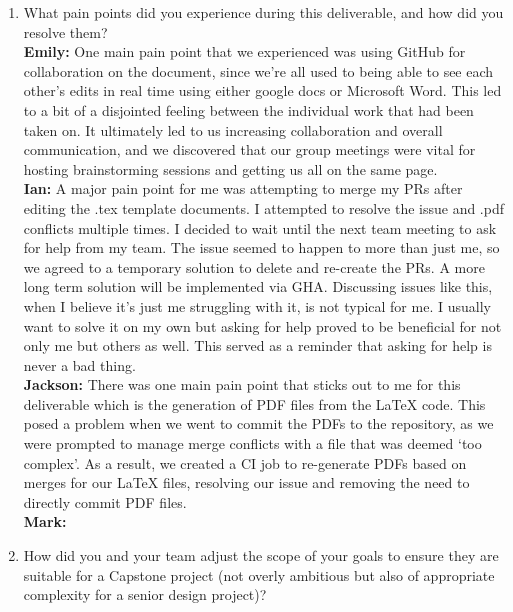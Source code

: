 \documentclass{article}
\begin{document}
\begin{enumerate}
    \item What pain points did you experience during this deliverable, and how
    did you resolve them?\\
    \textbf{Emily:} One main pain point that we experienced was using GitHub for collaboration on the document, since we’re all used to being able to see each 
                    other’s edits in real time using either google docs or Microsoft Word. This led to a bit of a disjointed feeling between the individual work 
                    that had been taken on. It ultimately led to us increasing collaboration and overall communication, and we discovered that our group meetings 
                    were vital for hosting brainstorming sessions and getting us all on the same page. \\
    \textbf{Ian:} A major pain point for me was attempting to merge my PRs after editing the .tex template documents. I attempted to resolve the issue and .pdf conflicts multiple times. 
    I decided to wait until the next team meeting to ask for help from my team. The issue seemed to happen to more than just me, so we agreed to a temporary solution to delete and re-create 
    the PRs. A more long term solution will be implemented via GHA. Discussing issues like this, when I believe it’s just me struggling with it, is not typical for me. I usually want to solve 
    it on my own but asking for help proved to be beneficial for not only me but others as well. This served as a reminder that asking for help is never a bad thing.\\
    \textbf{Jackson:} There was one main pain point that sticks out to me for this deliverable which is the generation of PDF files from the LaTeX code. This posed 
                    a problem when we went to commit the PDFs to the repository, as we were prompted to manage merge conflicts with a file that was deemed ‘too complex’. As a result, 
                    we created a CI job to re-generate PDFs based on merges for our LaTeX files, resolving our issue and removing the need to directly commit PDF files.\\
    \textbf{Mark:} \\

    \item How did you and your team adjust the scope of your goals to ensure
    they are suitable for a Capstone project (not overly ambitious but also of
    appropriate complexity for a senior design project)?
\end{enumerate}  
\end{document}
